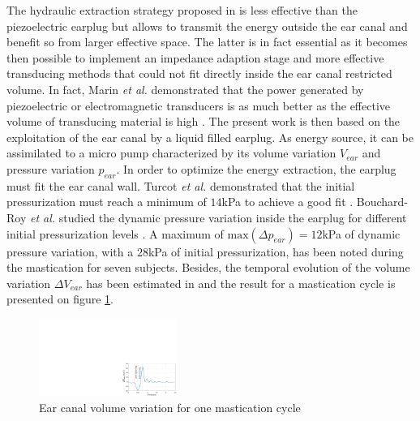 \documentclass[3p,twocolumn,preprint]{elsarticle}
\begin{document}
The hydraulic extraction strategy proposed in \cite{Delnavaz2012} is less effective than the piezoelectric earplug but allows to transmit the energy outside the ear canal and benefit so from larger effective space. The latter is in fact essential as it becomes then possible to implement an impedance adaption stage and more effective transducing methods that could not fit directly inside the ear canal restricted volume. In fact, Marin \emph{et al.} demonstrated that the power generated by piezoelectric or electromagnetic transducers is as much better as the effective volume of transducing material is high \cite{Marin2011}. The present work is then based on the exploitation of the ear canal by a liquid filled earplug. As energy source, it can be assimilated to a micro pump characterized by its volume variation $V_{ear}$ and pressure variation $p_{ear}$. In order to optimize the energy extraction, the earplug must fit the ear canal wall. Turcot \emph{et al.} demonstrated that the initial pressurization must reach a minimum of $14$kPa to achieve a good fit \cite{TURCOT2011}. Bouchard-Roy \emph{et al.} studied the dynamic pressure variation inside the earplug for different initial pressurization levels \cite{Bouchard-Roy2020}. A maximum of $\text{max}(\Delta p_{ear})=12$kPa of dynamic pressure variation, with a $28$kPa of initial pressurization, has been noted during the mastication for seven subjects. Besides, the temporal evolution of the volume variation $\Delta V_{ear}$ has been estimated in \cite{Delnavaz2012} and the result for a mastication cycle is presented on figure \ref{fig:deltaV_ear}.
\begin{figure}[!htbp]
	\centering
	\captionsetup{justification=centering}
	\includegraphics[trim={20.5cm 0cm 0cm 10.8cm},clip, width=0.4\textwidth]{figures/deltaV_ear.pdf}
	\caption{Ear canal volume variation for one mastication cycle}
	\label{fig:deltaV_ear}
\end{figure}
\end{document}
